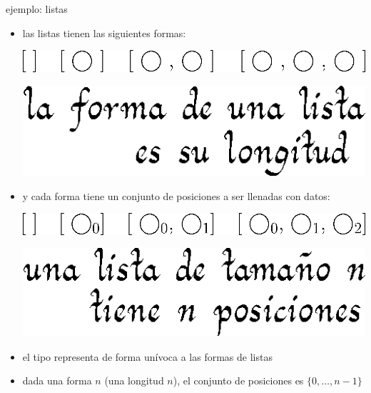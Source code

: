 \documentclass[9pt]{beamer}
\newcommand{\saltar}{\vspace{1ex}}
\begin{document}
\begin{frame}{ejemplo: listas}
  \begin{itemize}
  \item las listas tienen las siguientes formas:\saltar
    \begin{center}\hspace{-2cm}\includegraphics[scale=0.5]{img/elistsh.eps}\end{center}
    \pause
    \begin{flushright}\hspace{-2cm}\includegraphics[scale=0.5]{img/laformadeunalistaessulongitud.eps}\end{flushright}
    \pause
  \item y cada forma tiene un conjunto de posiciones a ser llenadas con datos:\saltar
    \begin{center}\hspace{-2cm}\includegraphics[scale=0.5]{img/elistpos.eps}\end{center}
    \pause
    \begin{flushright}\hspace{-2cm}\includegraphics[scale=0.5]{img/unalistadetamanontienenposiciones.eps}\end{flushright}
    \pause
  \end{itemize}
  \begin{itemize} [triangle]
  \item el tipo  representa de forma unívoca a las formas de listas
  \item dada una forma $n$ (una longitud $n$), el conjunto de posiciones es $\{ 0, \ldots, n-1\}$
  \end{itemize}
\end{frame}
\end{document}
